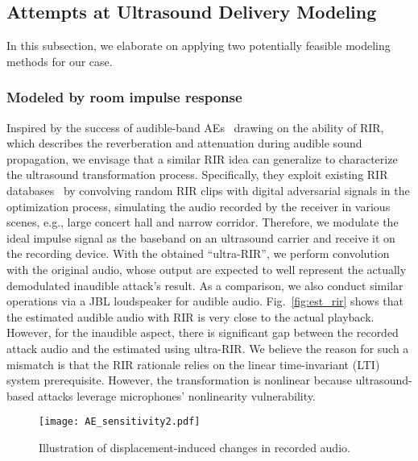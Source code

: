 \subsection{Attempts at Ultrasound Delivery Modeling}
In this subsection, we elaborate on applying two potentially feasible modeling methods for our case.

\subsubsection{Modeled by room impulse response}\label{sec:classic_rir}
Inspired by the success of audible-band AEs~\cite{rirIJCAI,schonherr2020imperio} drawing on the ability of RIR, which describes the reverberation and attenuation during audible sound propagation, we envisage that a similar RIR idea can generalize to characterize the ultrasound transformation process. Specifically, they exploit existing RIR databases~\cite{jeub2009binaural,nakamura2000acoustical} by convolving random RIR clips with digital adversarial signals in the optimization process, simulating the audio recorded by the receiver in various scenes, e.g., large concert hall and narrow corridor.
Therefore, we modulate the ideal impulse signal as the baseband on an ultrasound carrier and receive it on the recording device. With the obtained ``ultra-RIR'', we perform convolution with the original audio, whose output are expected to well represent the actually demodulated inaudible attack's result. As a comparison, we also conduct similar operations via a JBL loudspeaker for audible audio.
Fig.~\ref{fig:est_rir} shows that the estimated audible audio with RIR is very close to the actual playback. However, for the inaudible aspect, there is significant gap between the recorded attack audio and the estimated using ultra-RIR.
We believe the reason for such a mismatch is that the RIR rationale relies on the linear time-invariant (LTI) system prerequisite. However, the transformation is nonlinear because ultrasound-based attacks leverage microphones' nonlinearity vulnerability. %


\begin{figure}[t]
    \centering
    \texttt{[image: AE\_sensitivity2.pdf]}
    \caption{\label{fig:AE_sensitivity}Illustration of displacement-induced changes in recorded audio.}
    \vspace{-10pt}
\end{figure}

